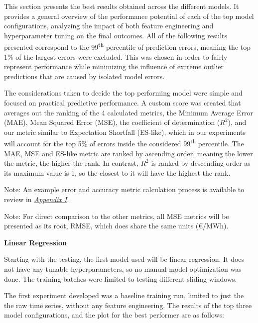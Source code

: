 \documentclass[12pt]{report} %
\begin{document}
This section presents the best results obtained across the different models. It provides a general overview of the performance potential of each of the top model configurations, analyzing the impact of both feature engineering and hyperparameter tuning on the final outcomes. All of the following results presented correspond to the 99\textsuperscript{th} percentile of prediction errors, meaning the top 1\% of the largest errors were excluded. This was chosen in order to fairly represent performance while minimizing the influence of extreme outlier predictions that are caused by isolated model errors.

The considerations taken to decide the top performing model were simple and focused on practical predictive performance. A custom score was created that averages out the ranking of the 4 calculated metrics, the Minimum Average Error (MAE), Mean Squared Error (MSE), the coefficient of determination ($R^2$), and our metric similar to Expectation Shortfall (ES-like), which in our experiments will account for the top 5\% of errors inside the considered 99\textsuperscript{th} percentile. The MAE, MSE and ES-like metric are ranked by ascending order, meaning the lower the metric, the higher the rank. In contrast, $R^2$ is ranked by descending order as its maximum value is 1, so the closest to it will have the highest the rank.

Note: An example error and accuracy metric calculation process is available to review in \textit{\hyperref[app:appendix_i_example_metric_calculation_process]{Appendix I}}.

Note: For direct comparison to the other metrics, all MSE metrics will be presented as its root, RMSE, which does share the same units (€/MWh).


\noindent \textbf{Linear Regression}

Starting with the testing, the first model used will be linear regression. It does not have any tunable hyperparameters, so no manual model optimization was done. The training batches were limited to testing different sliding windows.

The first experiment developed was a baseline training run, limited to just the the raw time series, without any feature engineering. The results of the top three model configurations, and the plot for the best performer are as follows:
\end{document}

